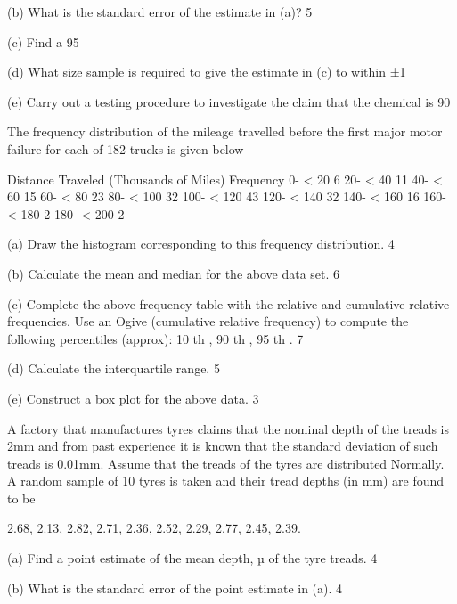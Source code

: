 (b) What is the standard error of the estimate in (a)? 			5 
 
(c) Find a 95%
 
(d) What size sample is required to give the estimate in (c) to within ±1%
 
(e) Carry out a testing procedure to investigate the claim that the chemical is 90%
 
The frequency distribution of the mileage travelled before the first major motor failure 
for each of 182 trucks is given below 
 
 

 
Distance Traveled 
(Thousands of Miles) 		Frequency 
0- < 20 			      6 
20- < 40 			      11 
40- < 60 			      15 
60- < 80 			      23 
80- < 100 			      32 
100- < 120 		     43 
120- < 140 	                 32 
140- < 160 	                 16 
160- < 180 	                  2 
180- < 200 	                  2 
 
(a) Draw the histogram corresponding to this frequency distribution. 	4 

(b) Calculate the mean and median for the above data set.			6 
 
(c) Complete the above frequency table with the relative and cumulative relative frequencies. Use an Ogive (cumulative relative frequency) to compute the following  percentiles  (approx): 10 th , 90 th , 95 th . 				7 
 
(d) Calculate the interquartile range. 						5
 
(e) Construct a box plot for the above data. 					3


A factory that manufactures tyres claims that the nominal depth of the treads is 2mm and from past experience it is known that the standard deviation of such treads is 0.01mm. Assume that the treads of the tyres are distributed Normally. A random sample of 10 tyres is taken and their tread depths (in mm) are found to be 
 
2.68, 2.13, 2.82, 2.71, 2.36, 2.52, 2.29, 2.77, 2.45, 2.39.
 
(a) Find a point estimate of the mean depth, µ of the tyre treads. 		4 
 
(b) What is the standard error of the point estimate in (a). 			4
 
